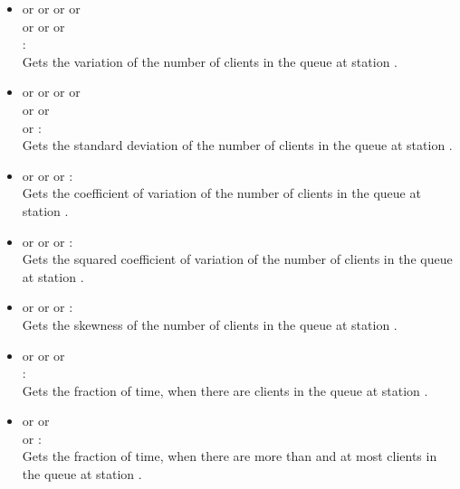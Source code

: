 \begin{itemize}
\item
{} or  or  or  or\\
 or  or  or\\
:\\
Gets the variation of the number of clients in the queue at station .

\item
{} or  or  or  or\\
 or  or\\
 or :\\
Gets the standard deviation of the number of clients in the queue at station .

\item
{} or  or  or :\\
Gets the coefficient of variation of the number of clients in the queue at station .

\item
{} or  or  or :\\
Gets the squared coefficient of variation of the number of clients in the queue at station .

\item
{} or  or  or :\\
Gets the skewness of the number of clients in the queue at station .

\item
{} or  or  or\\ :\\
Gets the fraction of time, when there are  clients in the queue at station .

\item
{} or  or\\  or :\\
Gets the fraction of time, when there are more than  and at most  clients in the queue at station .

\end{itemize}



